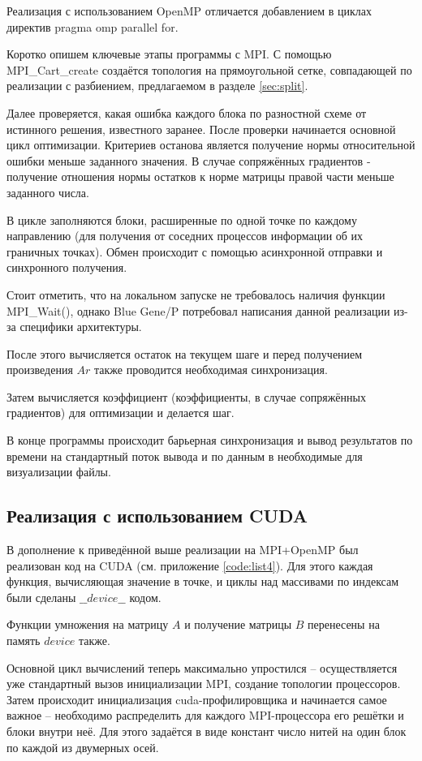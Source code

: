 \documentclass[12pt, fleqn]{article}
\theoremstyle{definition}
\begin{document}
Реализация с использованием OpenMP отличается добавлением в циклах директив pragma omp parallel for.

Коротко опишем ключевые этапы программы с MPI. С помощью MPI\_Ca\-rt\_cre\-ate создаётся топология на прямоугольной сетке, совпадающей по реализации с разбиением, предлагаемом в разделе \ref{sec:split}.  

Далее проверяется, какая ошибка каждого блока по разностной схеме от истинного решения, известного заранее. После проверки начинается основной цикл оптимизации. Критериев останова является получение нормы относительной ошибки меньше заданного значения. В случае сопряжённых градиентов - получение отношения нормы остатков к норме матрицы правой части меньше заданного числа.

В цикле заполняются блоки, расширенные по одной точке по каждому направлению (для получения от соседних процессов информации об их граничных точках). Обмен происходит с помощью асинхронной отправки и синхронного получения.

Стоит отметить, что на локальном запуске не требовалось наличия функции MPI\_Wait(), однако Blue Gene/P потребовал написания данной реализации из-за специфики архитектуры. 

После этого вычисляется остаток на текущем шаге и перед получением произведения $Ar$ также проводится необходимая синхронизация. 

Затем вычисляется коэффициент (коэффициенты, в случае сопряжённых градиентов) для оптимизации и делается шаг.

В конце программы происходит барьерная синхронизация и вывод результатов по времени на стандартный поток вывода и по данным в необходимые для визуализации файлы.
\subsection{Реализация с использованием CUDA}
В дополнение к приведённой выше реализации на MPI+OpenMP был реализован код на CUDA (см. приложение \ref{code:list4}). Для этого каждая функция, вычисляющая значение в точке, и циклы над массивами по индексам были сделаны $\_\_device\_\_$ кодом. 

Функции умножения на матрицу $A$ и получение матрицы $B$ перенесены на память $device$ также. 

Основной цикл вычислений теперь максимально упростился -- осуществляется уже стандартный вызов инициализации MPI, создание топологии процессоров. Затем происходит инициализация cuda-профилировщика и начинается самое важное -- необходимо распределить для каждого MPI-процессора его решётки и блоки внутри неё. Для этого задаётся в виде констант число нитей на один блок по каждой из двумерных осей.
\end{document}
